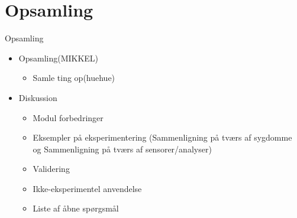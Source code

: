 \section{Opsamling}
\begin{frame}{Opsamling}
\begin{itemize}
\item Opsamling(MIKKEL)
\begin{itemize}
\item Samle ting op(huehue)
\end{itemize}
\item Diskussion
\begin{itemize}
\item Modul forbedringer
\item Eksempler på eksperimentering (Sammenligning på tværs af sygdomme og Sammenligning på tværs af sensorer/analyser)
\item Validering
\item Ikke-eksperimentel anvendelse
\item Liste af åbne spørgsmål
\end{itemize}
\end{itemize}
\end{frame}
